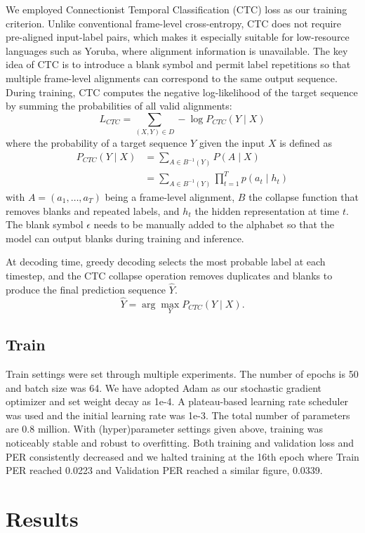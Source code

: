 \documentclass[11pt]{article}
\begin{document}
{We employed Connectionist Temporal Classification (CTC) loss as our training criterion. Unlike conventional frame-level cross-entropy, CTC does not require pre-aligned input-label pairs, which makes it especially suitable for low-resource languages such as Yoruba, where alignment information is unavailable. The key idea of CTC is to introduce a blank symbol and permit label repetitions so that multiple frame-level alignments can correspond to the same output sequence. During training, CTC computes the negative log-likelihood of the target sequence by summing the probabilities of all valid alignments: 
$$L_{CTC} = \sum_{(X, Y) \in D} - \log P_{CTC}(Y \mid X)$$
where the probability of a target sequence $Y$ given the input $X$ is defined as
\[
\begin{aligned}
P_{CTC}(Y \mid X) &= \sum_{A \in B^{-1}(Y)} P(A \mid X) \\
                  &= \sum_{A \in B^{-1}(Y)} \prod_{t=1}^{T} p(a_t \mid h_t)
\end{aligned}
\]
with $A=(a_1, \dots, a_T)$ being a frame-level alignment, $B$ the collapse function that removes blanks and repeated labels, and $h_t$ the hidden representation at time $t$. The blank symbol $\epsilon$ needs to be manually added to the alphabet so that the model can output blanks during training and inference.

At decoding time, greedy decoding selects the most probable label at each timestep, and the CTC collapse operation removes duplicates and blanks to produce the final prediction sequence $\hat{Y}$. 
$$\hat{Y} = \arg\max_{Y} P_{CTC}(Y \mid X).$$

\subsection{Train}
Train settings were set through multiple experiments. The number of epochs is 50 and batch size was 64. We have adopted Adam as our stochastic gradient optimizer and set weight decay as 1e-4. A plateau-based learning rate scheduler was used and the initial learning rate was 1e-3. The total number of parameters are 0.8 million. With (hyper)parameter settings given above, training was noticeably stable and robust to overfitting. Both training and validation loss and PER consistently decreased and we halted training at the 16th epoch where Train PER reached 0.0223 and Validation PER reached a similar figure, 0.0339. 

\section{Results}

}
\end{document}
